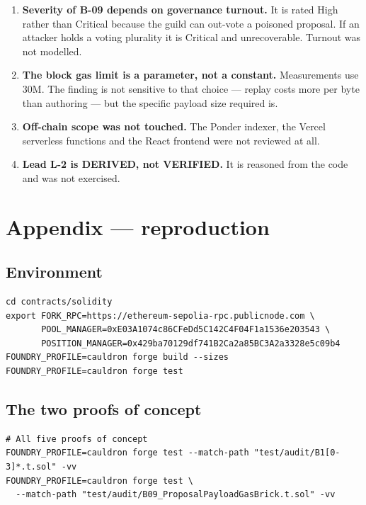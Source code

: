 \documentclass[11pt,a4paper]{article}
\newcommand{\code}[1]{\texttt{\small #1}}
\begin{document}
\begin{enumerate}
      run showed \code{invariant\_PERP2\_TotalEthMatchesDefinition} failing with an HTTP 429
      from the public Sepolia RPC during fork setup. It passed on re-run. It is a
      rate-limit, not a defect --- but it means invariant runs against the public endpoint
      are not reliably reproducible.
\item \textbf{Severity of B-09 depends on governance turnout.} It is rated High rather than
      Critical because the guild can out-vote a poisoned proposal. If an attacker holds a
      voting plurality it is Critical and unrecoverable. Turnout was not modelled.
\item \textbf{The block gas limit is a parameter, not a constant.} Measurements use 30M.
      The finding is not sensitive to that choice --- replay costs more per byte than
      authoring --- but the specific payload size required is.
\item \textbf{Off-chain scope was not touched.} The Ponder indexer, the Vercel serverless
      functions and the React frontend were not reviewed at all.
\item \textbf{Lead L-2 is DERIVED, not VERIFIED.} It is reasoned from the code and was not
      exercised.
\end{enumerate}

\section{Appendix --- reproduction}

\subsection{Environment}

\begin{lstlisting}
cd contracts/solidity
export FORK_RPC=https://ethereum-sepolia-rpc.publicnode.com \
       POOL_MANAGER=0xE03A1074c86CFeDd5C142C4F04F1a1536e203543 \
       POSITION_MANAGER=0x429ba70129df741B2Ca2a85BC3A2a3328e5c09b4
FOUNDRY_PROFILE=cauldron forge build --sizes
FOUNDRY_PROFILE=cauldron forge test
\end{lstlisting}

\subsection{The two proofs of concept}

\begin{lstlisting}
# All five proofs of concept
FOUNDRY_PROFILE=cauldron forge test --match-path "test/audit/B1[0-3]*.t.sol" -vv
FOUNDRY_PROFILE=cauldron forge test \
  --match-path "test/audit/B09_ProposalPayloadGasBrick.t.sol" -vv
\end{lstlisting}
\end{document}
